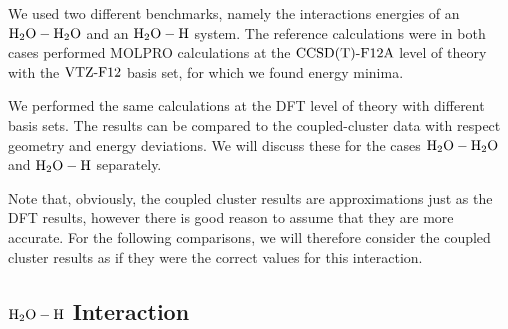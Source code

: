\documentclass[8.5pt,twoside,twocolumn]{article}
\theoremstyle{standard}
\begin{document}
We used two different benchmarks, namely the interactions energies of an $\text H _2 \text O-\text H _2 \text O$ and an $\text H _2 \text O-\text H$ system.
The reference calculations were in both cases performed MOLPRO \cite{MOLPRO_brief} calculations
at the $\text{CCSD(T)-F12A}$ \cite{CCSDTF12} level of theory with the $\text{VTZ-F}12$\cite{VTZ} basis set, for
which we found energy minima. 

We performed the same calculations at the DFT level of theory with different basis sets. The results can be compared
to the coupled-cluster data with respect geometry and energy deviations. We will discuss these for the cases $\text H _2 \text O-\text H _2 \text O$ and $\text H _2 \text O-\text H$
separately.

Note that, obviously, the coupled cluster results are approximations just as the DFT results, however
there is good reason to assume that they are more accurate. For the following comparisons, we will
therefore consider the coupled cluster results as if they were the correct values for this
interaction.

\subsection{$\text H _2 \text O-\text H$ Interaction}

\end{document}
